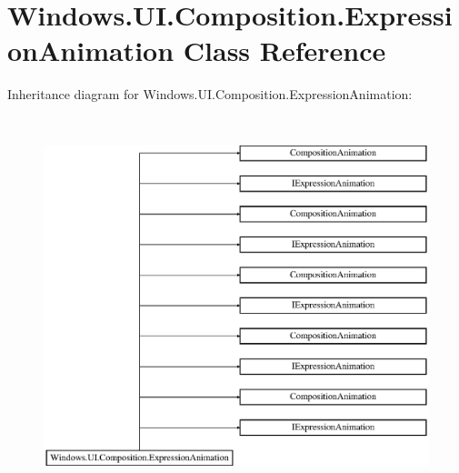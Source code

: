 \hypertarget{class_windows_1_1_u_i_1_1_composition_1_1_expression_animation}{}\section{Windows.\+U\+I.\+Composition.\+Expression\+Animation Class Reference}
\label{class_windows_1_1_u_i_1_1_composition_1_1_expression_animation}
Inheritance diagram for Windows.\+U\+I.\+Composition.\+Expression\+Animation\+:\begin{figure}[H]
\begin{center}
\leavevmode
\includegraphics[height=11.000000cm]{class_windows_1_1_u_i_1_1_composition_1_1_expression_animation}
\end{center}
\end{figure}
